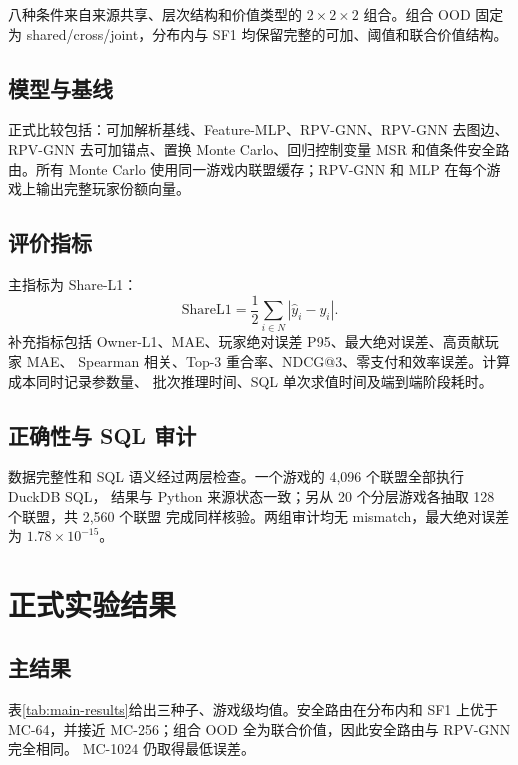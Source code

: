 \documentclass{coursepaper}
\begin{document}
八种条件来自来源共享、层次结构和价值类型的 \(2\times2\times2\) 组合。组合 OOD
固定为 shared/cross/joint，分布内与 SF1 均保留完整的可加、阈值和联合价值结构。

\subsection{模型与基线}

正式比较包括：可加解析基线、Feature-MLP、RPV-GNN、RPV-GNN 去图边、RPV-GNN
去可加锚点、置换 Monte Carlo、回归控制变量 MSR 和值条件安全路由。所有 Monte Carlo
使用同一游戏内联盟缓存；RPV-GNN 和 MLP 在每个游戏上输出完整玩家份额向量。

\subsection{评价指标}

主指标为 Share-L1：
\[
  \mathrm{ShareL1}
  =
  \frac{1}{2}\sum_{i\in N}
  \left|\hat y_i-y_i\right|.
\]
补充指标包括 Owner-L1、MAE、玩家绝对误差 P95、最大绝对误差、高贡献玩家 MAE、
Spearman 相关、Top-3 重合率、NDCG@3、零支付和效率误差。计算成本同时记录参数量、
批次推理时间、SQL 单次求值时间及端到端阶段耗时。

\subsection{正确性与 SQL 审计}

数据完整性和 SQL 语义经过两层检查。一个游戏的 4,096 个联盟全部执行 DuckDB SQL，
结果与 Python 来源状态一致；另从 20 个分层游戏各抽取 128 个联盟，共 2,560 个联盟
完成同样核验。两组审计均无 mismatch，最大绝对误差为 \(1.78\times10^{-15}\)。

\section{正式实验结果}

\subsection{主结果}

表\ref{tab:main-results}给出三种子、游戏级均值。安全路由在分布内和 SF1 上优于
MC-64，并接近 MC-256；组合 OOD 全为联合价值，因此安全路由与 RPV-GNN 完全相同。
MC-1024 仍取得最低误差。
\end{document}
